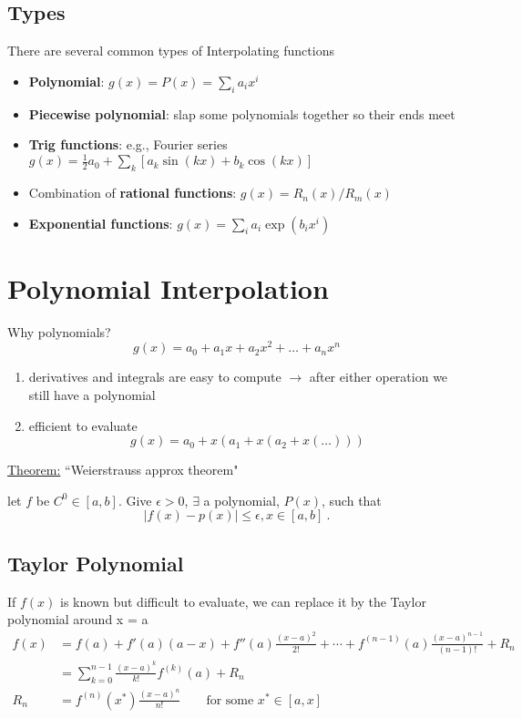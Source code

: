 \documentclass[12pt]{article}
\begin{document}
\subsection{Types}
There are several common types of Interpolating functions
%
\begin{itemize}
\item \textbf{Polynomial}: $g(x) = P(x) = \sum_i a_i x^i$

\item \textbf{Piecewise polynomial}: slap some polynomials together so their ends meet

\item \textbf{Trig functions}: e.g., Fourier series $g(x) = \frac{1}{2} a_0 + \sum_k [a_k \sin(kx) + b_k \cos(kx)]$ %

\item Combination of \textbf{rational functions}: $g(x) = R_n(x)/R_m(x)$

\item \textbf{Exponential functions}: $g(x) = \sum_i a_i \exp(b_i x^i)$
\end{itemize}


\section{Polynomial Interpolation}
Why polynomials?
\[g(x) = a_0 + a_1 x + a_2 x^2 + \dots +a_n x^n\]

\begin{enumerate}
\item derivatives and integrals are easy to compute $\rightarrow$ after either operation we still have a polynomial
\item efficient to evaluate
\[g(x) = a_0 + x(a_1 + x(a_2 + x(\dots)))\]
\end{enumerate}

\underline{Theorem:} ``Weierstrauss approx theorem"

let $f$ be $C^0 \in [a,b]$. Give $\epsilon > 0$, $\exists$ a polynomial, $P(x)$, such that 
\[|f(x) - p(x)| \leq \epsilon, x \in [a,b] \:.\]

\subsection{Taylor Polynomial}
If $f(x)$ is known but difficult to evaluate, we can replace it by the
Taylor polynomial around x = a
\begin{align}
f(x) &= f(a) + f'(a)(a-x) + f''(a)\frac{(x-a)^2}{2!} + \cdots + f^{(n-1)}(a)\frac{(x-a)^{n-1}}{(n-1)!} + R_n \\
%
  &= \sum_{k=0}^{n-1}\frac{(x-a)^k}{k!}f^{(k)}(a) + R_n \\
%
R_n &= f^{(n)}(x^*)\frac{(x-a)^{n}}{n!} \qquad \text{for some } x^* \in [a, x]
\end{align}
\end{document}
